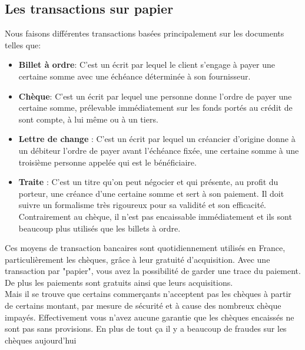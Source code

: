 \documentclass[12pt]{report}
\begin{document}
    \subsection{Les transactions sur papier}
\hspace{1cm} Nous faisons différentes transactions basées principalement sur les documents telles que:

\begin{itemize}
    
    \item \textbf{Billet à ordre}: C'est un écrit par lequel le client s'engage à payer une certaine somme avec une échéance déterminée à son fournisseur.
    
    \item \textbf{Chèque}: C'est un écrit par lequel une personne donne l'ordre de payer une certaine somme, prélevable immédiatement sur les fonds portés au crédit de sont compte, à lui même ou à un tiers.
    
    \item \textbf{Lettre de change }: C'est un écrit par lequel un créancier d'origine donne à un débiteur l'ordre de payer avant l'échéance fixée, une certaine somme à une troisième personne appelée qui est le bénéficiaire.
    
    \item \textbf{Traite} : C'est un titre qu'on peut négocier et qui présente, au profit du porteur, une créance d'une certaine somme et sert à son paiement. Il doit suivre un formalisme très rigoureux pour sa validité et son efficacité. Contrairement au chèque, il n'est pas encaissable immédiatement et ils sont beaucoup plus utilisés que les billets à ordre.

\end{itemize}
    
\hspace{1cm} Ces moyens de transaction bancaires sont quotidiennement utilisés en France, particulièrement les chèques, grâce à leur gratuité d'acquisition. Avec une transaction par "papier", vous avez la possibilité de garder une trace du paiement.  De plus les paiements sont gratuits ainsi que leurs acquisitions.\\

\hspace{1cm} Mais il se trouve que certains commerçants n'acceptent pas les chèques à partir de certains montant, par mesure de sécurité et à cause  des nombreux chèque impayés. Effectivement vous n'avez aucune garantie que les chèques encaissés ne sont pas sans provisions. En plus de tout ça il y a beaucoup de fraudes sur les chèques aujourd'hui \\
\end{document}
